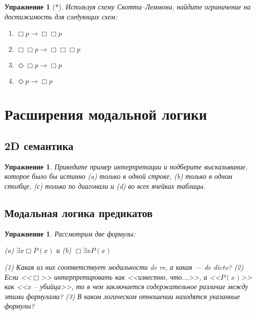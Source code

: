 \documentclass[11pt]{article}
\newtheorem{exercise}[theorem]{Упражнение}
\begin{document}
\begin{exercise}[*] Используя схему Скотта–Леммона, найдите ограничение на достижимость для следующих схем:
\begin{multicols}{2}
\begin{enumerate}
	\item $\Box p \to \Box \Box p$
	\item $\Box \Box p \to \Box \Box \Box p$
	\item $\Diamond \Box p \to \Box p$
	\item $\Diamond  p \to \Box p$
\end{enumerate}
\end{multicols}
\end{exercise}


\section{Расширения модальной логики}

\subsection{ 2D семантика}
\begin{exercise} Приведите пример интерпретации и подберите высказывание, которое было бы истинно (a) только в одной строке, (b) только в одном столбце, (с) только по диагонали и (d) во всех ячейках таблицы.
\end{exercise}

\subsection{Модальная логика предикатов}

\begin{exercise} Рассмотрим две формулы:

\begin{center}
(a) $\exists x \Box P(x)$ и (b) $\Box \exists x P(x)$	
\end{center}
(1) Какая из них соответствует модальности \textit{de re}, а какая — \textit{de dicto}? (2) Если <<$\Box$>> интерпретировать как <<известно, что...>>, а <<$P(x)$>> как <<$x$ – убийца>>, то в чем заключается содержательное различие между этими формулами? (3) В каком логическом отношении находятся указанные формулы?
\end{exercise}
\end{document}
